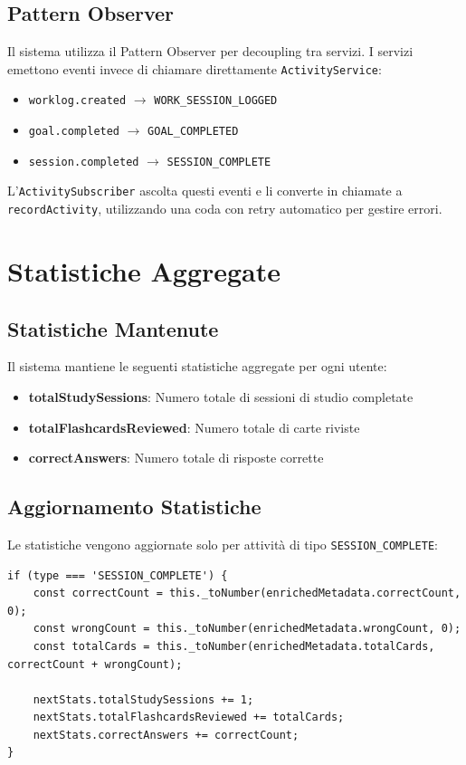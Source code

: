 \documentclass[11pt,a4paper]{article}
\begin{document}
\subsection{Pattern Observer}

Il sistema utilizza il Pattern Observer per decoupling tra servizi. I servizi emettono eventi invece di chiamare direttamente \texttt{ActivityService}:

\begin{itemize}
    \item \texttt{worklog.created} $\rightarrow$ \texttt{WORK\_SESSION\_LOGGED}
    \item \texttt{goal.completed} $\rightarrow$ \texttt{GOAL\_COMPLETED}
    \item \texttt{session.completed} $\rightarrow$ \texttt{SESSION\_COMPLETE}
\end{itemize}

L'\texttt{ActivitySubscriber} ascolta questi eventi e li converte in chiamate a \texttt{recordActivity}, utilizzando una coda con retry automatico per gestire errori.

\section{Statistiche Aggregate}

\subsection{Statistiche Mantenute}

Il sistema mantiene le seguenti statistiche aggregate per ogni utente:

\begin{itemize}
    \item \textbf{totalStudySessions}: Numero totale di sessioni di studio completate
    \item \textbf{totalFlashcardsReviewed}: Numero totale di carte riviste
    \item \textbf{correctAnswers}: Numero totale di risposte corrette
\end{itemize}

\subsection{Aggiornamento Statistiche}

Le statistiche vengono aggiornate solo per attività di tipo \texttt{SESSION\_COMPLETE}:

\begin{lstlisting}
if (type === 'SESSION_COMPLETE') {
    const correctCount = this._toNumber(enrichedMetadata.correctCount, 0);
    const wrongCount = this._toNumber(enrichedMetadata.wrongCount, 0);
    const totalCards = this._toNumber(enrichedMetadata.totalCards, correctCount + wrongCount);

    nextStats.totalStudySessions += 1;
    nextStats.totalFlashcardsReviewed += totalCards;
    nextStats.correctAnswers += correctCount;
}
\end{lstlisting}
\end{document}
